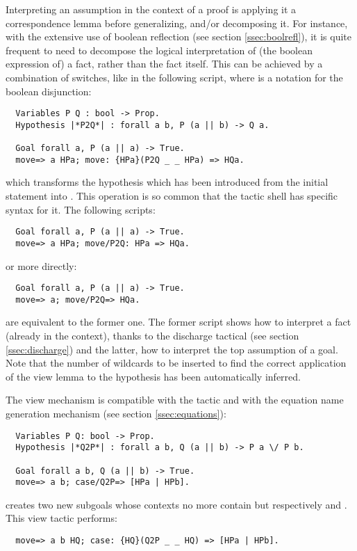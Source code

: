 Interpreting an assumption in the context of a proof is applying it a
correspondence lemma before generalizing, and/or decomposing it.
For instance, with the extensive use of boolean reflection (see
section \ref{ssec:boolrefl}), it is
quite frequent to need to decompose the logical interpretation of (the
boolean expression of) a
fact, rather than the fact itself.
This can be achieved by a combination of 
switches, like in the following script, where \ssrC{||} is a notation for
the boolean disjunction:
\begin{lstlisting}
  Variables P Q : bool -> Prop.
  Hypothesis |*P2Q*| : forall a b, P (a || b) -> Q a.

  Goal forall a, P (a || a) -> True.
  move=> a HPa; move: {HPa}(P2Q _ _ HPa) => HQa.
\end{lstlisting}
which transforms the hypothesis  which has been
introduced from the initial statement into .
This operation is so common that the tactic shell has
specific syntax for it.
The following scripts:
\begin{lstlisting}
  Goal forall a, P (a || a) -> True.
  move=> a HPa; move/P2Q: HPa => HQa.
\end{lstlisting}
or more directly:
\begin{lstlisting}
  Goal forall a, P (a || a) -> True.
  move=> a; move/P2Q=> HQa.
\end{lstlisting}
are equivalent to the former one. The former script shows how to
interpret a fact (already in the context), thanks to the discharge
tactical (see section \ref{ssec:discharge}) and the latter, how to
interpret the top assumption of a goal. Note
that the number of wildcards to be inserted to find the correct
application of the view lemma to the hypothesis has been automatically
inferred.

The view mechanism is compatible with the  tactic and with the
equation name generation mechanism (see section \ref{ssec:equations}):
\begin{lstlisting}
  Variables P Q: bool -> Prop.
  Hypothesis |*Q2P*| : forall a b, Q (a || b) -> P a \/ P b.

  Goal forall a b, Q (a || b) -> True.
  move=> a b; case/Q2P=> [HPa | HPb].
\end{lstlisting}
creates two new subgoals whose contexts no more contain
 but respectively  and
. This view tactic
performs:
\begin{lstlisting}
  move=> a b HQ; case: {HQ}(Q2P _ _ HQ) => [HPa | HPb].
\end{lstlisting}

